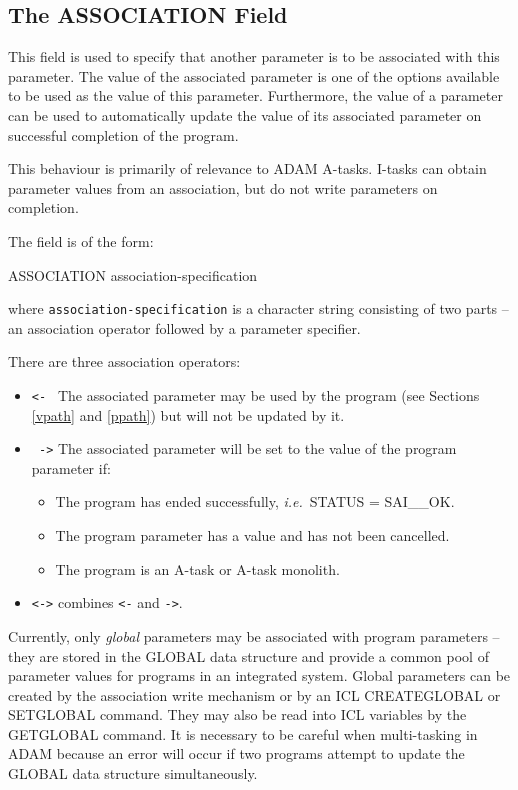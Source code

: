\documentclass[twoside,11pt,nolof]{starlink}
\begin{document}
\subsection{The ASSOCIATION Field
\label{association}}

This field is used to specify that another parameter is to be associated
with this parameter.
The value of the associated parameter is one of the options available to be
used as the value of this parameter.
Furthermore, the value of a parameter can be used to automatically update
the value of its associated parameter on successful completion of the
program.

This behaviour is primarily of relevance to ADAM A-tasks. I-tasks
can obtain parameter values from an association, but do not write
parameters on completion.

The field is of the form:
\begin{terminalv}
ASSOCIATION  association-specification
\end{terminalv}
where \texttt{association-specification} is a character string consisting of two
parts -- an association operator followed by a parameter specifier.

There are three association operators:
\begin{itemize}
\item \texttt{<- } The associated parameter may be used by the program (see
Sections \ref{vpath} and \ref{ppath}) but will not be updated by it.
\item \texttt{ ->} The associated parameter will be set to the value of the
program parameter if:
\begin{itemize}
\item The program has ended successfully, \emph{i.e.}\ STATUS = SAI\_\_OK.
\item The program parameter has a value and has not been cancelled.
\item The program is an A-task or A-task monolith.
\end{itemize}
\item \texttt{<->} combines \texttt{<-} and \texttt{->}.
\end{itemize}

Currently, only \emph{global} parameters may be associated with program
parameters  -- they are stored in the GLOBAL data structure and provide a
common pool of parameter values for programs in an integrated system.
Global parameters can be created by the association write
mechanism or by an ICL CREATEGLOBAL or SETGLOBAL command. They may also be
read into ICL variables by the GETGLOBAL command.
It is necessary to be careful when multi-tasking in ADAM because
an error will occur if two programs attempt to update the GLOBAL data
structure simultaneously.
\end{document}
